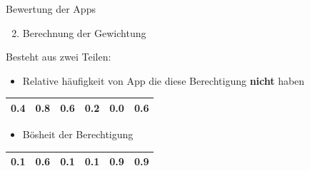 \documentclass[compress,t]{beamer}
\begin{document}
\begin{frame}{Bewertung der Apps}

    \begin{enumerate}
        \setcounter{enumi}{1}
        \item Berechnung der Gewichtung
    \end{enumerate}

    Besteht aus zwei Teilen:
    \begin{itemize}
        \item Relative häufigkeit von App die diese Berechtigung \textbf{nicht} haben
    \end{itemize}

    \begin{center}
    \begin{tabular}{|*{6}{c|}}
        \hline
        0.4 & 0.8 & 0.6 & 0.2 & 0.0 & 0.6 \\
        \hline
    \end{tabular}
    \end{center}

    \begin{itemize}
        \item Bösheit der Berechtigung
    \end{itemize}

    \begin{center}
    \begin{tabular}{|*{6}{c|}}
        \hline
        0.1 & 0.6 & 0.1 & 0.1 & 0.9 & 0.9 \\
        \hline
    \end{tabular}
    \end{center}

\end{frame}
\end{document}
